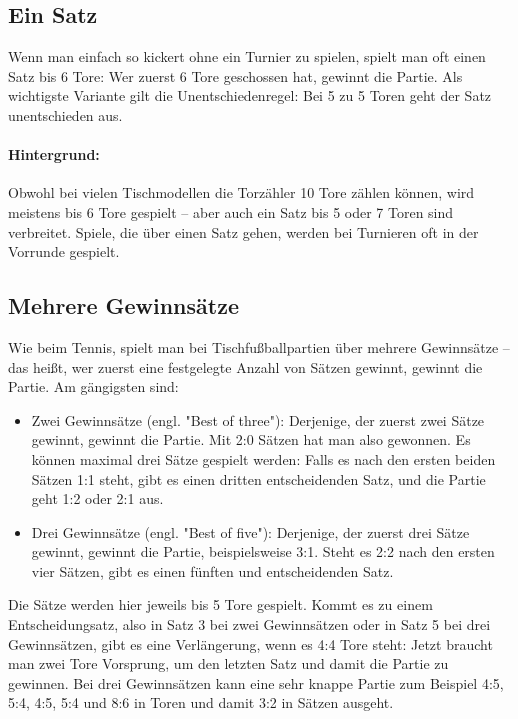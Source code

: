 \subsection{Ein Satz}
\label{spielformen:zaehlweisen:einsatz}

Wenn man einfach so kickert ohne ein Turnier zu spielen, spielt man oft einen Satz bis 6 Tore: Wer zuerst 6 Tore geschossen hat, gewinnt die Partie.
Als wichtigste Variante gilt die Unentschiedenregel: Bei 5 zu 5 Toren geht der Satz unentschieden aus.

\paragraph{Hintergrund:}
Obwohl bei vielen Tischmodellen die Torzähler 10 Tore zählen können, wird meistens bis 6 Tore gespielt -- aber auch ein Satz bis 5 oder 7 Toren sind verbreitet.
Spiele, die über einen Satz gehen, werden bei Turnieren oft in der Vorrunde gespielt.


\subsection{Mehrere Gewinnsätze}
\label{spielformen:zaehlweisen:gewinnsaetze}

Wie beim Tennis, spielt man bei Tischfußballpartien über mehrere Gewinnsätze -- das heißt, wer zuerst eine festgelegte Anzahl von Sätzen gewinnt, gewinnt die Partie. Am gängigsten sind:
\begin{itemize}
\item Zwei Gewinnsätze (engl. "Best of three"): Derjenige, der zuerst zwei Sätze gewinnt, gewinnt die Partie. Mit 2:0 Sätzen hat man also gewonnen. 
Es können maximal drei Sätze gespielt werden: Falls es nach den ersten beiden Sätzen 1:1 steht, gibt es einen dritten entscheidenden Satz, und die Partie geht 1:2 oder 2:1 aus. 
\item Drei Gewinnsätze (engl. "Best of five"): Derjenige, der zuerst drei Sätze gewinnt, gewinnt die Partie, beispielsweise 3:1. Steht es 2:2 nach den ersten vier Sätzen, gibt es einen fünften und entscheidenden Satz. 
\end{itemize}
Die Sätze werden hier jeweils bis 5 Tore gespielt. Kommt es zu einem Entscheidungsatz, also in Satz 3 bei zwei Gewinnsätzen oder in Satz 5 bei drei Gewinnsätzen, gibt es eine Verlängerung, wenn es 4:4 Tore steht: Jetzt braucht man zwei Tore Vorsprung, um den letzten Satz und damit die Partie zu gewinnen. Bei drei Gewinnsätzen kann eine sehr knappe Partie zum Beispiel 4:5, 5:4, 4:5, 5:4 und 8:6 in Toren und damit 3:2 in Sätzen ausgeht. 

